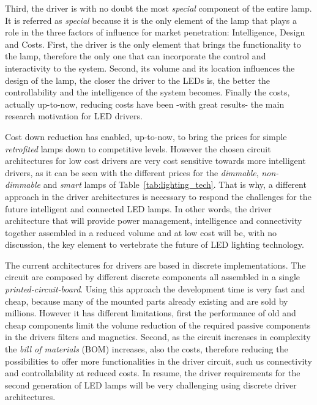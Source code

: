 Third, the driver is with no doubt the most \emph{special} component of the entire lamp. It is referred as \emph{special} because it is the only element of the lamp that plays a role in the three factors of influence for market penetration: Intelligence, Design and Costs. First, the driver is the only element that brings the functionality to the lamp, therefore the only one that can incorporate the control and interactivity to the system. Second, its volume and its location influences the design of the lamp, the closer the driver to the LEDs is, the better the controllability and the intelligence of the system becomes. Finally the costs, actually up-to-now, reducing costs have been -with great results- the main research motivation for LED drivers. 

Cost down reduction has enabled, up-to-now, to bring the prices for simple \emph{retrofited} lamps down to competitive levels. However the chosen circuit architectures for low cost drivers are very cost sensitive towards more intelligent drivers, as it can be seen with the different prices for the \emph{dimmable}, \emph{non-dimmable} and \emph{smart} lamps of  Table~\ref{tab:lighting_tech}. That is why, a different approach in the driver architectures is necessary  to respond the challenges for the future intelligent and connected LED lamps. In other words, the driver architecture that will provide power management, intelligence and connectivity together assembled in a reduced volume and at low cost will be, with no discussion, the key element to vertebrate the future of LED lighting technology.

The current architectures for drivers are based in discrete implementations. The circuit are composed by different discrete components all assembled in a single \emph{printed-circuit-board}. Using this approach the development time is very fast and cheap, because many of the mounted parts already existing and are sold by millions. However it has different limitations, first the performance of old and cheap components limit the volume reduction of the required  passive components in the drivers filters and magnetics. Second, as the circuit increases in complexity the \emph{bill of materials} (BOM) increases, also the costs, therefore reducing the possibilities to offer more functionalities in the driver circuit, such us connectivity and controllability at reduced costs. In resume, the driver requirements for the second generation of LED lamps will be very challenging using  discrete driver  architectures.

